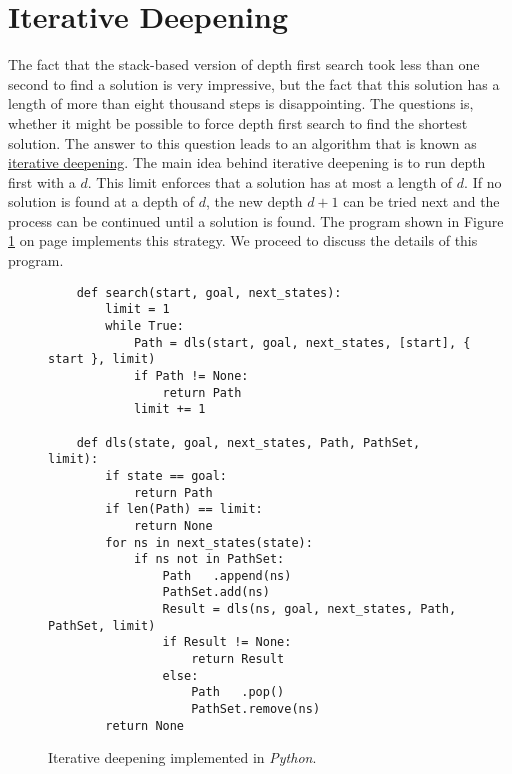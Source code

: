 \section{Iterative Deepening}
The fact that the stack-based version of depth first search took less than one second to find a solution is very
impressive, but the fact that this solution has a length of more than eight thousand steps is disappointing.
The questions is, whether it might be possible to force depth first search to find the shortest 
solution.  The answer to this question leads to an algorithm that is known as
\href{https://en.wikipedia.org/wiki/Iterative_deepening_depth-first_search}{iterative deepening}.
 The main idea behind iterative deepening is to run depth first with a  $d$.  This limit enforces that a solution has at most a length of $d$.  If no solution is found at a
depth of $d$, the new depth $d+1$ can be tried next and the process can be continued until a solution is found.
The program shown in Figure \ref{fig:Iterative-Deepening.ipynb} on page \pageref{fig:Iterative-Deepening.ipynb}
implements this strategy.  We proceed to discuss the details of this program.

\begin{figure}[!ht]
\centering
\begin{verbatim}
    def search(start, goal, next_states):
        limit = 1
        while True:
            Path = dls(start, goal, next_states, [start], { start }, limit)
            if Path != None:
                return Path
            limit += 1
    
    def dls(state, goal, next_states, Path, PathSet, limit):
        if state == goal:
            return Path
        if len(Path) == limit:
            return None
        for ns in next_states(state):
            if ns not in PathSet:
                Path   .append(ns)
                PathSet.add(ns)
                Result = dls(ns, goal, next_states, Path, PathSet, limit)
                if Result != None:
                    return Result
                else:
                    Path   .pop()
                    PathSet.remove(ns)
        return None
\end{verbatim}
\vspace*{-0.3cm}
\caption{Iterative deepening implemented in \textsl{Python}.}
\label{fig:Iterative-Deepening.ipynb}
\end{figure}

